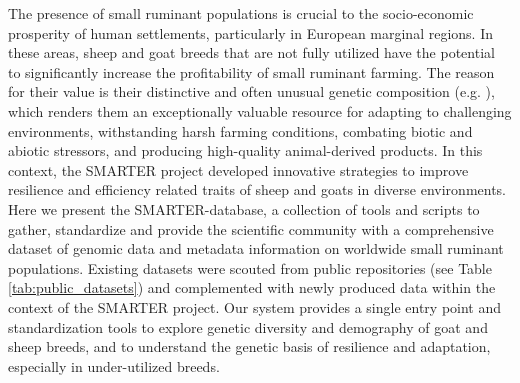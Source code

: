 \documentclass[a4paper,num-refs,gigabyte]{oup-contemporary}
\begin{document}
The presence of small ruminant populations is crucial to the socio-economic prosperity of human settlements, particularly in European marginal regions. In these areas, sheep and goat breeds that are not fully utilized have the potential to significantly increase the profitability of small ruminant farming. The reason for their value is their distinctive and often unusual genetic composition (e.g. \citep{Stella2018,Kijas2012}), which renders them an exceptionally valuable resource for adapting to challenging environments, withstanding harsh farming conditions, combating biotic and abiotic stressors, and producing high-quality animal-derived products. In this context, the SMARTER project\citep{SmarterProjectEU} developed innovative strategies to improve resilience and efficiency related traits of sheep and goats in diverse environments.
Here we present the SMARTER-database, a collection of tools and scripts to gather, standardize and provide the scientific community with a comprehensive dataset of genomic data and metadata information on worldwide small ruminant populations. Existing datasets were scouted from public repositories (see Table \ref{tab:public_datasets}) and complemented with newly produced data within the context of the SMARTER project\citep{SmarterProjectEU}. Our system provides a single entry point and standardization tools to explore genetic diversity and demography of goat and sheep breeds, and to understand the genetic basis of resilience and adaptation, especially in under-utilized breeds.
\end{document}
